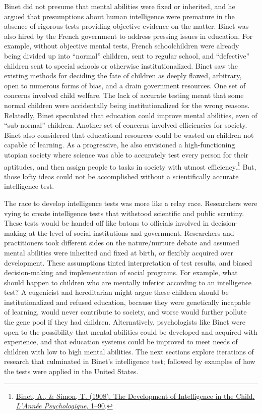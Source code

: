 \documentclass[
  oneside,
  12pt]{crumpbook}
\begin{document}
Binet did not presume that mental abilities were fixed or inherited, and he argued that presumptions about human intelligence were premature in the absence of rigorous tests providing objective evidence on the matter. Binet was also hired by the French government to address pressing issues in education. For example, without objective mental tests, French schoolchildren were already being divided up into ``normal'' children, sent to regular school, and ``defective'' children sent to special schools or otherwise institutionalized. Binet saw the existing methods for deciding the fate of children as deeply flawed, arbitrary, open to numerous forms of bias, and a drain government resources. One set of concerns involved child welfare. The lack of accurate testing meant that some normal children were accidentally being institutionalized for the wrong reasons. Relatedly, Binet speculated that education could improve mental abilities, even of ``sub-normal'' children. Another set of concerns involved efficiencies for society. Binet also considered that educational resources could be wasted on children not capable of learning. As a progressive, he also envisioned a high-functioning utopian society where science was able to accurately test every person for their aptitudes, and then assign people to tasks in society with utmost efficiency.\footnote{\protect\hyperlink{ref-binetDevelopmentIntelligenceChild1908}{Binet, A., \& Simon, T. (1908). The {Development} of {Intelligence} in the {Child}. \emph{L'Année Psychologique}, 1--90}.} But, those lofty ideas could not be accomplished without a scientifically accurate intelligence test.

The race to develop intelligence tests was more like a relay race. Researchers were vying to create intelligence tests that withstood scientific and public scrutiny. These tests would be handed off like batons to officials involved in decision-making at the level of social institutions and government. Researchers and practitioners took different sides on the nature/nurture debate and assumed mental abilities were inherited and fixed at birth, or flexibly acquired over development. These assumptions tinted interpretation of test results, and biased decision-making and implementation of social programs. For example, what should happen to children who are mentally inferior according to an intelligence test? A eugenicist and hereditarian might argue these children should be institutionalized and refused education, because they were genetically incapable of learning, would never contribute to society, and worse would further pollute the gene pool if they had children. Alternatively, psychologists like Binet were open to the possibility that mental abilities could be developed and acquired with experience, and that education systems could be improved to meet needs of children with low to high mental abilities. The next sections explore iterations of research that culminated in Binet's intelligence test; followed by examples of how the tests were applied in the United States.
\end{document}
